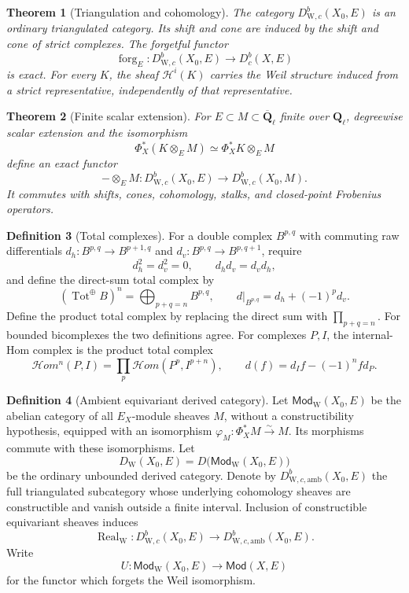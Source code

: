\documentclass[10pt]{article}
\newtheorem{theorem}{Theorem}[section]
\theoremstyle{definition}
\newtheorem{definition}[theorem]{Definition}
\newcommand{\Ql}{\mathbf Q_\ell}
\newcommand{\Qlb}{\overline{\mathbf Q}_\ell}
\newcommand{\Dbc}{D^b_c}
\newcommand{\WeilD}{D^b_{\mathrm W,c}}
\begin{document}
\begin{theorem}[Triangulation and cohomology]
The category \(\WeilD(X_0,E)\) is an ordinary triangulated category.  Its
shift and cone are induced by the shift and cone of strict complexes.  The
forgetful functor
\[
 \operatorname{forg}_E:\WeilD(X_0,E)\longrightarrow\Dbc(X,E)
\]
is exact.  For every \(K\), the sheaf \(\mathcal H^i(K)\) carries the Weil
structure induced from a strict representative, independently of that
representative.
\end{theorem}

\begin{theorem}[Finite scalar extension]
For \(E\subset M\subset\Qlb\) finite over \(\Ql\), degreewise scalar
extension and the isomorphism
\[
 \Phi_X^*(K\otimes_E M)\simeq\Phi_X^*K\otimes_E M
\]
define an exact functor
\[
 -\otimes_E M:\WeilD(X_0,E)\longrightarrow\WeilD(X_0,M).
\]
It commutes with shifts, cones, cohomology, stalks, and closed-point
Frobenius operators.
\end{theorem}

\begin{definition}[Total complexes]
For a double complex \(B^{p,q}\) with commuting raw differentials
\(d_h:B^{p,q}\to B^{p+1,q}\) and
\(d_v:B^{p,q}\to B^{p,q+1}\), require
\[
 d_h^2=d_v^2=0,\qquad d_hd_v=d_vd_h,
\]
and define the direct-sum total complex by
\[
 (\operatorname{Tot}^{\oplus}B)^n=\bigoplus_{p+q=n}B^{p,q},
 \qquad d|_{B^{p,q}}=d_h+(-1)^p d_v.
\]
Define the product total complex by replacing the direct sum with
\(\prod_{p+q=n}\).  For bounded bicomplexes the two definitions agree.
For complexes \(P,I\), the internal-Hom complex is the product total
complex
\[
 \mathcal Hom^n(P,I)=\prod_p\mathcal Hom(P^p,I^{p+n}),
 \qquad d(f)=d_I f-(-1)^n f d_P.
\]
\end{definition}

\begin{definition}[Ambient equivariant derived category]
Let \(\mathsf{Mod}_{\mathrm W}(X_0,E)\) be the abelian category of all
\(E_X\)-module sheaves \(M\), without a constructibility hypothesis,
equipped with an isomorphism
\(\varphi_M:\Phi_X^*M\xrightarrow{\sim}M\).  Its morphisms commute with
these isomorphisms.  Let
\[
 D_{\mathrm W}(X_0,E)=D\bigl(\mathsf{Mod}_{\mathrm W}(X_0,E)\bigr)
\]
be the ordinary unbounded derived category.  Denote by
\(D^b_{\mathrm W,c,\mathrm{amb}}(X_0,E)\) the full triangulated subcategory
whose underlying cohomology sheaves are constructible and vanish outside a
finite interval.  Inclusion of constructible equivariant sheaves induces
\[
 \operatorname{Real}_{\mathrm W}:\WeilD(X_0,E)
       \longrightarrow D^b_{\mathrm W,c,\mathrm{amb}}(X_0,E).
\]
Write
\[
 U:\mathsf{Mod}_{\mathrm W}(X_0,E)\longrightarrow
       \mathsf{Mod}(X,E)
\]
for the functor which forgets the Weil isomorphism.
\end{definition}
\end{document}
